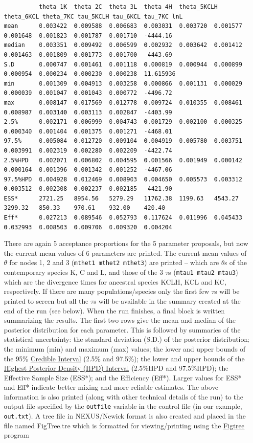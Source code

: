 \documentclass[a4paper]{book}
\numberwithin{equation}{section} \renewcommand{\baselinestretch}{0.55}
\begin{document}
{\begin{verbatim}
          theta_1K  theta_2C  theta_3L	theta_4H  theta_5KCLH theta_6KCL theta_7KC tau_5KCLH tau_6KCL tau_7KC lnL
mean      0.003422  0.009588  0.006683  0.003031  0.003720  0.001577  0.001648  0.001823  0.001787  0.001710  -4444.16
median    0.003351  0.009492  0.006599  0.002932  0.003642  0.001412  0.001463  0.001809  0.001773  0.001700  -4443.69
S.D       0.000747  0.001461  0.001118  0.000819  0.000944  0.000899  0.000954  0.000234  0.000230  0.000238  11.615936
min       0.001309  0.004913  0.003258  0.000866  0.001131  0.000029  0.000039  0.001047  0.001043  0.000772  -4496.72
max       0.008147  0.017569  0.012778  0.009724  0.010355  0.008461  0.008987  0.003140  0.003113  0.002847  -4403.99
2.5%      0.002171  0.006999  0.004743  0.001729  0.002100  0.000325  0.000340  0.001404  0.001375  0.001271  -4468.01
97.5%     0.005084  0.012720  0.009104  0.004919  0.005780  0.003751  0.003991  0.002319  0.002280  0.002209  -4422.74
2.5%HPD   0.002071  0.006802  0.004595  0.001566  0.001949  0.000142  0.000164  0.001396  0.001342  0.001252  -4467.06
97.5%HPD  0.004928  0.012469  0.008903  0.004650  0.005573  0.003312  0.003512  0.002308  0.002237  0.002185  -4421.90
ESS*      2721.25   8954.56   5279.29   11762.38  1199.63   4543.27   3299.32   850.33    970.61    932.00    420.40
Eff*      0.027213  0.089546  0.052793  0.117624  0.011996  0.045433  0.032993  0.008503  0.009706  0.009320  0.004204

\end{verbatim}
}
There are again 5 acceptance proportions for the 5 parameter proposals, but now the current mean values of 6
parameters are printed. The current mean values of $\theta$ for nodes 1, 2 and 3 (\texttt{mthet1 mthet2 mthet3})
are printed -- which are $\theta$s of the contemporary species K, C and L, and those of
the 3 $\tau$s (\texttt{mtau1  mtau2  mtau3}) which are the divergence times for ancestral species
KCLH, KCL and KC, respectively. If there are many populations/species only the first few $\tau$s will be printed to
screen but all the $\tau$s will be available in the summary created at the end of the run (see below).
When the run finishes, a final block is written summarizing the results. The first two
rows give the mean and median of the posterior distribution for each parameter. This is followed by
summaries of the statistical uncertainty: the standard deviation (S.D.) of the posterior distribution;
the minimum (min) and maximum (max) values; the lower and upper bounds of the 95\%
\href{https://en.wikipedia.org/wiki/Credible_interval}{Credible Interval} (2.5\% and 97.5\%);
the lower and upper bounds of the \href{https://en.wikipedia.org/wiki/Credible_interval}{Highest Posterior Density (HPD) Interval} (2.5\%HPD and 97.5\%HPD);
the Effective Sample Size (ESS*); and the Efficiency (Eff*). Larger values for ESS* and Eff* indicate better
mixing and more reliable estimates.
The above information is also printed (along with other technical details of the run)
to the output file specified by the \texttt{outfile} variable in the control file (in our example, \texttt{out.txt}).
A tree file in NEXUS/Newick format is also created and placed in the file named FigTree.tre which is formatted
for viewing/printing using the \href{http://tree.bio.ed.ac.uk/software/figtree/}{Figtree} program
\end{document}
